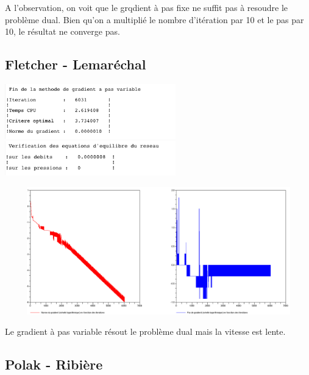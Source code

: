 A l'observation, on voit que le grqdient à pas fixe ne suffit pas à resoudre le problème dual. Bien qu'on a multiplié le nombre d'itération par 10 et le pas par 10, le résultat ne converge pas.

\subsection{Fletcher - Lemaréchal}

\begin{center}
  \includegraphics[width=20em,valign=t]{d_wolfe.png}
  \includegraphics[width=20em,valign=t]{d_wolfe_v.png}

  \includegraphics[width=40em,height=15em]{d_wolfe_f.png}
\end{center}

Le gradient à pas variable résout le problème dual mais la vitesse est lente.

\subsection{Polak - Ribière}

